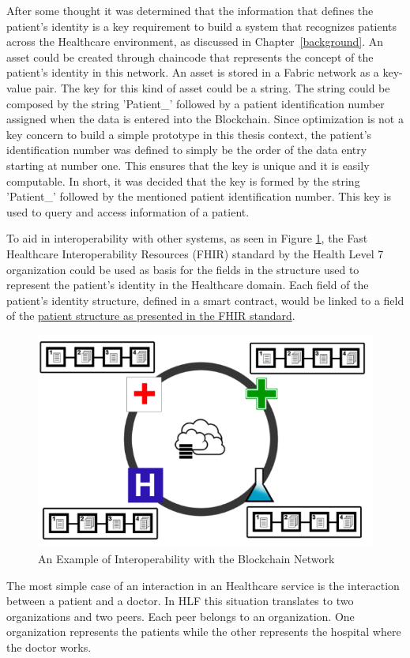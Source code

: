 After some thought it was determined that the information that defines the
patient's identity is a key requirement to build a system that recognizes
patients across the Healthcare environment, as discussed in
Chapter~\ref{background}. An asset could be created through chaincode that
represents the concept of the patient's identity in this network. An asset is
stored in a Fabric network as a key-value pair. The key for this kind of asset
could be a string. The string could be composed by the string 'Patient\_'
followed by a patient identification number assigned when the data is entered
into the Blockchain. Since optimization is not a key concern to build a simple
prototype in this thesis context, the patient's identification number was
defined to simply be the order of the data entry starting at number one. This
ensures that the key is unique and it is easily computable. In short, it was
decided that the key is formed by the string 'Patient\_' followed by the
mentioned patient identification number. This key is used to query and access
information of a patient.

To aid in interoperability with other systems, as seen in Figure
\ref{fig:interoperability}, the Fast Healthcare Interoperability Resources
(FHIR) standard by the Health Level 7 organization could be used as basis for
the fields in the structure used to represent the patient's identity in the
Healthcare domain.  Each field of the patient's identity structure, defined in
a smart contract, would be linked to a field of the
\href{http://www.hl7.org/fhir/patient.html}{patient structure as presented in
the FHIR standard}.

\begin{figure}[ht] \centering
\includegraphics[width=0.7\linewidth]{imgs/interoperability.png}
\caption{\label{fig:interoperability}An Example of Interoperability with the
Blockchain Network} \end{figure}

The most simple case of an interaction in an Healthcare service is the
interaction between a patient and a doctor. In HLF this situation translates to
two organizations and two peers. Each peer belongs to an organization. One
organization represents the patients while the other represents the hospital
where the doctor works. 

